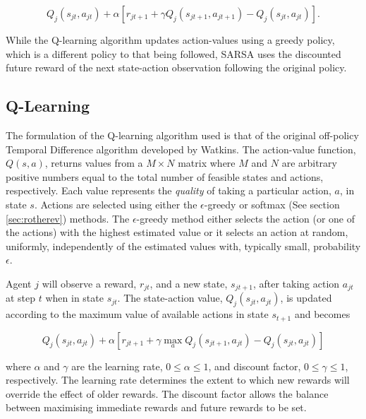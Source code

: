 \begin{equation}
Q_j(s_{jt},a_{jt}) + \alpha [r_{jt+1} + \gamma Q_j(s_{jt+1},a_{jt+1}) -
Q_j(s_{jt},a_{jt})] \text{.}
\end{equation}

While the Q-learning algorithm updates action-values using a greedy policy,
which is a different policy to that being followed, SARSA uses the discounted
future reward of the next state-action observation following the original
policy.

\subsection{Q-Learning}
\label{sec:qlearning}
The formulation of the Q-learning algorithm used is that of the original
off-policy Temporal Difference algorithm developed by
Watkins\cite{watkins:1989}.  The action-value function, $Q(s,a)$, returns
values from a $M \times N$ matrix where $M$ and $N$ are arbitrary positive
numbers equal to the total number of feasible states and actions, respectively.
Each value represents the \textit{quality} of taking a particular action, $a$,
in state $s$.  Actions are selected using either the $\epsilon$-greedy or
softmax (See section \ref{sec:rotherev}) methods.  The $\epsilon$-greedy method
either selects the action (or one of the actions) with the highest estimated
value or it selects an action at random, uniformly, independently of the
estimated values with, typically small, probability $\epsilon$.

Agent $j$ will observe a reward, $r_{jt}$, and a new state, $s_{jt+1}$,
after taking action $a_{jt}$ at step $t$ when in state $s_{jt}$.  The
state-action value, $Q_j(s_{jt},a_{jt})$, is updated according to the
maximum value of available actions in state $s_{t+1}$ and becomes

\begin{equation}
\label{eq:qlearning}
Q_j(s_{jt},a_{jt}) + \alpha [r_{jt+1} + \gamma\max_{a} Q_j(s_{jt+1},a_{jt}) -
Q_j(s_{jt},a_{jt})]
\end{equation}

where $\alpha$ and $\gamma$ are the learning rate, $0\leq\alpha\leq1$, and
discount factor, $0\leq\gamma\leq1$, respectively.  The learning rate determines
the extent to which new rewards will override the effect of older rewards.
The discount factor allows the balance between maximising immediate rewards and
future rewards to be set.

